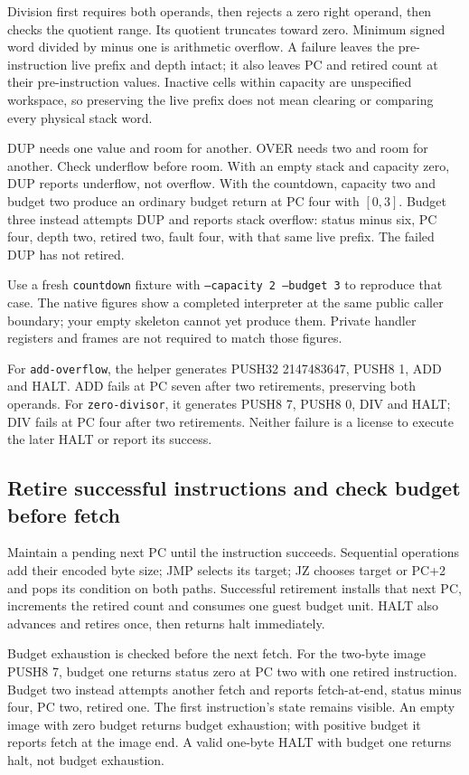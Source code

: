 Division first requires both operands, then rejects a zero right operand,
then checks the quotient range. Its quotient truncates toward zero. Minimum
signed word divided by minus one is arithmetic overflow. A failure leaves the
pre-instruction live prefix and depth intact; it also leaves PC and retired
count at their pre-instruction values. Inactive cells within capacity are
unspecified workspace, so preserving the live prefix does not mean clearing
or comparing every physical stack word.

DUP needs one value and room for another. OVER needs two and room for another.
Check underflow before room. With an empty stack and capacity zero, DUP reports
underflow, not overflow. With the countdown, capacity two and budget two produce
an ordinary budget return at PC four with \([0,3]\). Budget three instead attempts
DUP and reports stack overflow: status minus six, PC four, depth two, retired
two, fault four, with that same live prefix. The failed DUP has not retired.

Use a fresh \texttt{countdown} fixture with \texttt{--capacity 2 --budget 3}
to reproduce that case. The native figures show a completed interpreter at the
same public caller boundary; your empty skeleton cannot yet produce them.
Private handler registers and frames are not required to match those figures.



For \texttt{add-overflow}, the helper generates PUSH32 2147483647, PUSH8 1,
ADD and HALT. ADD fails at PC seven after two retirements, preserving both
operands. For \texttt{zero-divisor}, it generates PUSH8 7, PUSH8 0, DIV and
HALT; DIV fails at PC four after two retirements. Neither failure is a license
to execute the later HALT or report its success.

\subsection*{Retire successful instructions and check budget before fetch}

Maintain a pending next PC until the instruction succeeds. Sequential operations
add their encoded byte size; JMP selects its target; JZ chooses target or PC+2
and pops its condition on both paths. Successful retirement installs that next
PC, increments the retired count and consumes one guest budget unit. HALT also
advances and retires once, then returns halt immediately.

Budget exhaustion is checked before the next fetch. For the two-byte image
PUSH8 7, budget one returns status zero at PC two with one retired instruction.
Budget two instead attempts another fetch and reports fetch-at-end, status minus
four, PC two, retired one. The first instruction's state remains visible.
An empty image with zero budget returns budget exhaustion; with positive budget
it reports fetch at the image end. A valid one-byte HALT with budget one returns
halt, not budget exhaustion.

